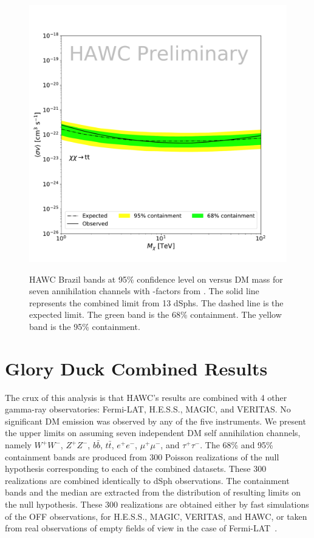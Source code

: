 \begin{figure}[h]
{    \includegraphics[scale=0.21]{figures/glory_duck/hawc/GD_BrazilBand_tt.pdf}
    }
    \caption{HAWC Brazil bands at 95\% confidence level on \sv versus DM mass for seven annihilation channels with \J-factors from \GS \cite{Geringer-Sameth:2014yza}. The solid line represents the combined limit from 13 dSphs. The dashed line is the expected limit. The green band is the 68\% containment. The yellow band is the 95\% containment.}
\label{fig:hawc_brazil_band}
\end{figure}

\clearpage

\section{Glory Duck Combined Results}\label{sec:results}

The crux of this analysis is that HAWC's results are combined with 4 other gamma-ray observatories: Fermi-LAT, H.E.S.S., MAGIC, and VERITAS.
\sloppy No significant DM emission was observed by any of the five instruments.
We present the upper limits on \sv assuming seven independent DM self annihilation channels, namely $W^+W^-$, $Z^+Z^-$, $b\bar{b}$, $t\bar{t}$, $e^+e^-$, $\mu^+\mu^-$, and $\tau^+\tau^-$.
The 68\% and 95\% containment bands are produced from 300 Poisson realizations of the null hypothesis corresponding to each of the combined datasets.
These 300 realizations are combined identically to dSph observations.
The containment bands and the median are extracted from the distribution of resulting limits on the null hypothesis.
These 300 realizations are obtained either by fast simulations of the OFF observations, for H.E.S.S., MAGIC, VERITAS, and HAWC, or taken from real observations of empty fields of view in the case of Fermi-LAT~\cite{2015PhRvL.115w1301A,Fermi-LAT:2016uux,2021PhRvD.103l3005D}.

